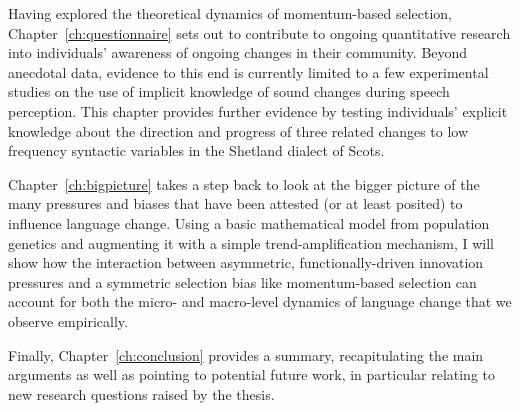 Having explored the theoretical dynamics of momentum-based selection, Chapter~\ref{ch:questionnaire} sets out to contribute to ongoing quantitative research into individuals' awareness of ongoing changes in their community. Beyond anecdotal data, evidence to this end is currently limited to a few experimental studies on the use of implicit knowledge of sound changes during speech perception. This chapter provides further evidence by testing individuals' explicit knowledge about the direction and progress of three related changes to low frequency syntactic variables in the Shetland dialect of Scots.

Chapter~\ref{ch:bigpicture} takes a step back to look at the bigger picture of the many pressures and biases that have been attested (or at least posited) to influence language change. Using a basic mathematical model from population genetics and augmenting it with a simple trend-amplification mechanism, I will show how the interaction between asymmetric, functionally-driven innovation pressures and a symmetric selection bias like momentum-based selection can account for both the micro- and macro-level dynamics of language change that we observe empirically.

Finally, Chapter~\ref{ch:conclusion} provides a summary, recapitulating the main arguments as well as pointing to potential future work, in particular relating to new research questions raised by the thesis.
